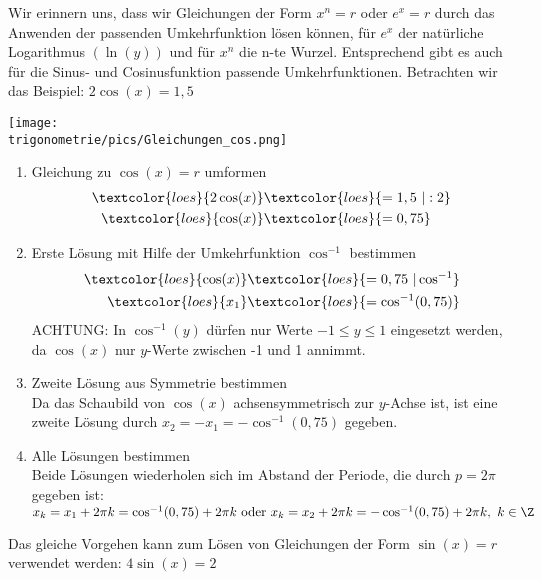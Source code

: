 Wir erinnern uns, dass wir Gleichungen der Form \(x^n=r\) oder \(e^x=r\) durch das Anwenden der passenden Umkehrfunktion lösen können, für \(e^x\) der natürliche Logarithmus \(\left(\ln(y)\right)\) und für \(x^n\) die n-te Wurzel. Entsprechend gibt es auch für die Sinus- und Cosinusfunktion passende Umkehrfunktionen. Betrachten wir das Beispiel: \(2\cos(x)=1,5\)\\
\begin{minipage}{\textwidth}
	\texttt{[image: \\trigonometrie/pics/Gleichungen\_cos.png]}\\
\end{minipage}
\begin{enumerate}
	\item Gleichung zu \(\cos(x)=r\) umformen
	\begin{align*}
		\textcolor{loes}{2\cos(x)}&\textcolor{loes}{=1,5\ \vert :2}\\
		\textcolor{loes}{\cos(x)}&\textcolor{loes}{=0,75}\\
	\end{align*}
	\item Erste Lösung mit Hilfe der Umkehrfunktion \(\cos^{-1}\) bestimmen
	\begin{align*}
		\textcolor{loes}{\cos(x)}&\textcolor{loes}{=0,75\ \vert \cos^{-1}}\\
		\textcolor{loes}{x_1}&\textcolor{loes}{=\cos^{-1}(0,75)}\\		
	\end{align*}
	\textcolor{loes}{ACHTUNG: In \(\cos^{-1}(y)\) dürfen nur Werte \(-1\leq y \leq1\) eingesetzt werden, da \(\cos(x)\) nur \(y\)-Werte zwischen -1 und 1 annimmt.}
	\item Zweite Lösung aus Symmetrie bestimmen\\
	\textcolor{loes}{Da das Schaubild von \(\cos(x)\) achsensymmetrisch zur \(y\)-Achse ist, ist eine zweite Lösung durch \(x_2=-x_1=-\cos^{-1}(0,75)\) gegeben.}\\
	\item Alle Lösungen bestimmen\\
	\textcolor{loes}{Beide Lösungen wiederholen sich im Abstand der Periode, die durch \(p=2\pi\) gegeben ist:\\
		\(x_k=x_1+2\pi k=\cos^{-1}(0,75)+2\pi k\text{ oder } x_k=x_2+2\pi k=-\cos^{-1}(0,75)+2\pi k,\ k\in \Z\)} 
\end{enumerate}
\newpage
Das gleiche Vorgehen kann zum Lösen von Gleichungen der Form \(\sin(x)=r\) verwendet werden: \(4\sin(x)=2\)\\
